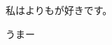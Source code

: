 \documentclass[dvipdfmx,media=ebook,paper=a4]{review-jsbook}
\begin{document}
私はよりもが好きです。

うまー
\end{document}
